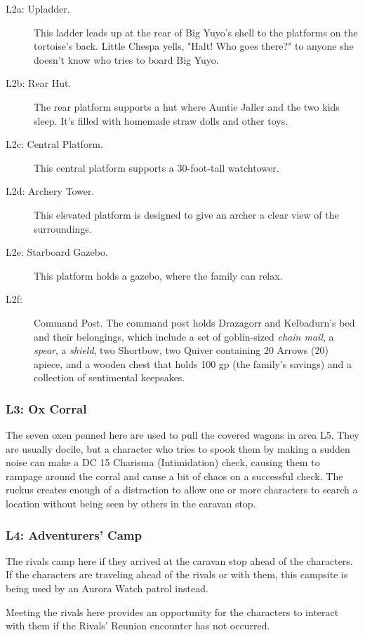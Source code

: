 \documentclass[10pt,a4paper,twoside,fancy,bg=print,twocolumn,openany,nodeprecatedcode]{dndbook}
\begin{document}
\begin{description}
\item[L2a: Upladder.]
This ladder leads up at the rear of Big Yuyo's shell to the platforms on the tortoise's back. Little Chespa yells, "Halt! Who goes there?" to anyone she doesn't know who tries to board Big Yuyo.
\item[L2b: Rear Hut.]
The rear platform supports a hut where Auntie Jaller and the two kids sleep. It's filled with homemade straw dolls and other toys.
\item[L2c: Central Platform.]
This central platform supports a 30-foot-tall watchtower.
\item[L2d: Archery Tower.]
This elevated platform is designed to give an archer a clear view of the surroundings.
\item[L2e: Starboard Gazebo.]
This platform holds a gazebo, where the family can relax.
\item[L2f:]
Command Post. The command post holds Drazagorr and Kelbadurn's bed and their belongings, which include a set of goblin-sized \textit{chain mail}, a \textit{spear}, a \textit{shield}, two Shortbow, two Quiver containing 20 Arrows (20) apiece, and a wooden chest that holds 100 gp (the family's savings) and a collection of sentimental keepsakes.
\end{description}

\subsubsection{L3: Ox Corral}
The seven oxen penned here are used to pull the covered wagons in area L5. They are usually docile, but a character who tries to spook them by making a sudden noise can make a DC 15 Charisma (Intimidation) check, causing them to rampage around the corral and cause a bit of chaos on a successful check. The ruckus creates enough of a distraction to allow one or more characters to search a location without being seen by others in the caravan stop.

\subsubsection{L4: Adventurers' Camp}
The rivals camp here if they arrived at the caravan stop ahead of the characters. If the characters are traveling ahead of the rivals or with them, this campsite is being used by an Aurora Watch patrol instead.

Meeting the rivals here provides an opportunity for the characters to interact with them if the Rivals' Reunion encounter has not occurred.
\end{document}
